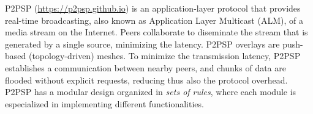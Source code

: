 P2PSP (\url{https://p2psp.github.io}) is an application-layer protocol
that provides real-time broadcasting, also known as Application Layer
Multicast (ALM), of a media stream on the Internet. Peers collaborate
to diseminate the stream that is generated by a single source,
minimizing the latency. P2PSP overlays are push-based
(topology-driven) meshes. To minimize the transmission latency, P2PSP
establishes a communication between nearby peers, and chunks of data
are flooded without explicit requests, reducing thus also the protocol
overhead. P2PSP has a modular design organized in \emph{sets of
rules}, where each module is especialized in implementing different
functionalities.
